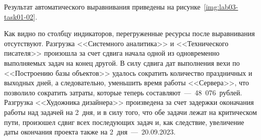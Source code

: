 
Результат автоматического выравнивания приведены на
рисунке~\ref{img:lab03-task01-02}.


Как видно по столбцу индикаторов, перегруженные ресурсы после выравнивания
отсутствуют. Разгрузка <<Системного аналитика>> и <<Технического писателя>>
произошла за счет сдвига начала одной из одновременно выполняемых задач на
конец другой. В силу сдвига дат выполнения вехи по <<Построению базы объектов>>
удалось сократить количество праздничных и выходных дней, а следовательно,
уменьшить время работы <<Сервера>>, что позволило сократить затраты, которые
теперь составляют~---~48~076~рублей. Разгрузка <<Художника дизайнера>>
произведена за счет задержки оконачания работы над задачей на 2~дня, и в силу
того, что обе задачи лежат на критическом пути, произошел сдвиг всех последующих
задач и, как следствие, увеличение даты окончания проекта также на
2~дня~---~20.09.2023.
